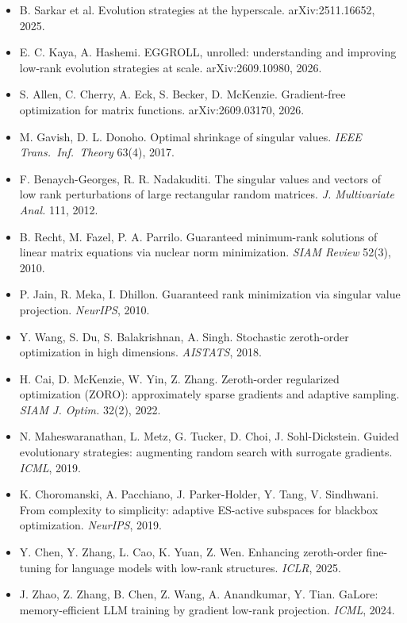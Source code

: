 \documentclass[11pt]{article}
\begin{document}
{\small
\begin{itemize}[leftmargin=2.2em,itemsep=0pt]
\item[{[1]}] B. Sarkar et al. Evolution strategies at the hyperscale. arXiv:2511.16652, 2025.
\item[{[2]}] E. C. Kaya, A. Hashemi. EGGROLL, unrolled: understanding and improving low-rank evolution strategies at scale. arXiv:2609.10980, 2026.
\item[{[3]}] S. Allen, C. Cherry, A. Eck, S. Becker, D. McKenzie. Gradient-free optimization for matrix functions. arXiv:2609.03170, 2026.
\item[{[4]}] M. Gavish, D. L. Donoho. Optimal shrinkage of singular values. \emph{IEEE Trans.\ Inf.\ Theory} 63(4), 2017.
\item[{[5]}] F. Benaych-Georges, R. R. Nadakuditi. The singular values and vectors of low rank perturbations of large rectangular random matrices. \emph{J. Multivariate Anal.} 111, 2012.
\item[{[6]}] B. Recht, M. Fazel, P. A. Parrilo. Guaranteed minimum-rank solutions of linear matrix equations via nuclear norm minimization. \emph{SIAM Review} 52(3), 2010.
\item[{[7]}] P. Jain, R. Meka, I. Dhillon. Guaranteed rank minimization via singular value projection. \emph{NeurIPS}, 2010.
\item[{[8]}] Y. Wang, S. Du, S. Balakrishnan, A. Singh. Stochastic zeroth-order optimization in high dimensions. \emph{AISTATS}, 2018.
\item[{[9]}] H. Cai, D. McKenzie, W. Yin, Z. Zhang. Zeroth-order regularized optimization (ZORO): approximately sparse gradients and adaptive sampling. \emph{SIAM J. Optim.} 32(2), 2022.
\item[{[10]}] N. Maheswaranathan, L. Metz, G. Tucker, D. Choi, J. Sohl-Dickstein. Guided evolutionary strategies: augmenting random search with surrogate gradients. \emph{ICML}, 2019.
\item[{[11]}] K. Choromanski, A. Pacchiano, J. Parker-Holder, Y. Tang, V. Sindhwani. From complexity to simplicity: adaptive ES-active subspaces for blackbox optimization. \emph{NeurIPS}, 2019.
\item[{[12]}] Y. Chen, Y. Zhang, L. Cao, K. Yuan, Z. Wen. Enhancing zeroth-order fine-tuning for language models with low-rank structures. \emph{ICLR}, 2025.
\item[{[13]}] J. Zhao, Z. Zhang, B. Chen, Z. Wang, A. Anandkumar, Y. Tian. GaLore: memory-efficient LLM training by gradient low-rank projection. \emph{ICML}, 2024.

\end{itemize}}
\end{document}
